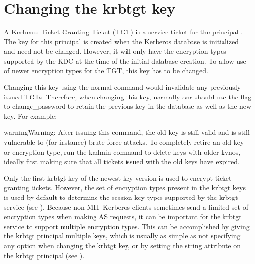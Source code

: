 \documentclass[letterpaper,10pt,english]{sphinxmanual}
\begin{document}
\section{Changing the krbtgt key}
\label{\detokenize{admin/database:changing-krbtgt-key}}\label{\detokenize{admin/database:changing-the-krbtgt-key}}
A Kerberos Ticket Granting Ticket (TGT) is a service ticket for the
principal .  The key for this principal is created
when the Kerberos database is initialized and need not be changed.
However, it will only have the encryption types supported by the KDC
at the time of the initial database creation.  To allow use of newer
encryption types for the TGT, this key has to be changed.

Changing this key using the normal {\hyperref[\detokenize{admin/admin_commands/kadmin_local:kadmin-1}]{}}
 command would invalidate any previously issued
TGTs.  Therefore, when changing this key, normally one should use the
 flag to change\_password to retain the previous key in the
database as well as the new key.  For example:

%
\begin{sphinxVerbatim}[commandchars=\\\{\}]
    
\end{sphinxVerbatim}

\begin{sphinxadmonition}{warning}{Warning:}
After issuing this command, the old key is still valid
and is still vulnerable to (for instance) brute force
attacks.  To completely retire an old key or encryption
type, run the kadmin  command to delete keys
with older kvnos, ideally first making sure that all
tickets issued with the old keys have expired.
\end{sphinxadmonition}

Only the first krbtgt key of the newest key version is used to encrypt
ticket-granting tickets.  However, the set of encryption types present
in the krbtgt keys is used by default to determine the session key
types supported by the krbtgt service (see
{\hyperref[\detokenize{admin/enctypes:session-key-selection}]{}}).  Because non-MIT Kerberos clients
sometimes send a limited set of encryption types when making AS
requests, it can be important for the krbtgt service to support
multiple encryption types.  This can be accomplished by giving the
krbtgt principal multiple keys, which is usually as simple as not
specifying any  option when changing the krbtgt key, or by
setting the  string attribute on the krbtgt
principal (see {\hyperref[\detokenize{admin/admin_commands/kadmin_local:set-string}]{}}).
\end{document}
